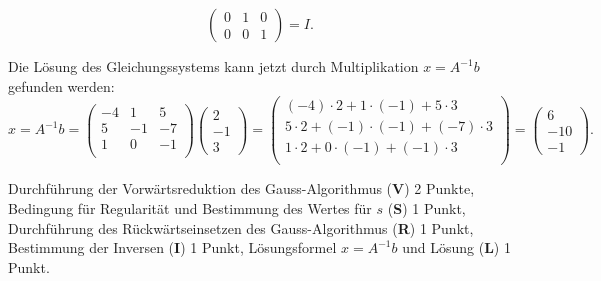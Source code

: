\begin{loesung}
\begin{teilaufgaben}
\[\begin{pmatrix}
0& 1 & 0 \\
0&0& 1
\end{pmatrix}
=I.
\]
\item Die Lösung des Gleichungssystems kann jetzt durch Multiplikation $x=A^{-1}b$
gefunden werden:
\[
 x = A^{-1}b = 
 \begin{pmatrix}
-4 & 1 & 5 \\
5 & -1 & -7\\
1 & 0 & -1 \\
\end{pmatrix}
\begin{pmatrix}
2\\ -1\\ 3
\end{pmatrix}
= 
\begin{pmatrix}
(-4)\cdot2 + 1\cdot (-1) + 5\cdot 3\\ 
5\cdot2 + (-1)\cdot (-1) + (-7)\cdot 3\\ 
1\cdot2 + 0\cdot (-1) + (-1)\cdot 3\\ 
\end{pmatrix}
=
\begin{pmatrix}
6\\ -10\\ -1
\end{pmatrix}.
\]
\end{teilaufgaben}
\end{loesung}

\begin{bewertung}
Durchführung der Vorwärtsreduktion des Gauss-Algorithmus ({\bf V}) 2 Punkte,
Bedingung für Regularität und Bestimmung des Wertes für $s$ ({\bf S}) 1 Punkt,
Durchführung des Rückwärtseinsetzen des Gauss-Algorithmus ({\bf R}) 1 Punkt,
Bestimmung der Inversen ({\bf I}) 1 Punkt,
Lösungsformel $x=A^{-1}b$ und Lösung ({\bf L}) 1 Punkt.
\end{bewertung}


